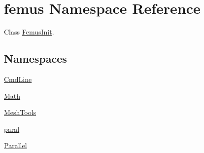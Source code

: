 \hypertarget{namespacefemus}{}\section{femus Namespace Reference}
\label{namespacefemus}


Class \mbox{\hyperlink{classfemus_1_1_femus_init}{Femus\+Init}}.  


\subsection*{Namespaces}
\begin{DoxyCompactItemize}
\item 
 \mbox{\hyperlink{namespacefemus_1_1_cmd_line}{Cmd\+Line}}
\item 
 \mbox{\hyperlink{namespacefemus_1_1_math}{Math}}
\item 
 \mbox{\hyperlink{namespacefemus_1_1_mesh_tools}{Mesh\+Tools}}
\item 
 \mbox{\hyperlink{namespacefemus_1_1paral}{paral}}
\item 
 \mbox{\hyperlink{namespacefemus_1_1_parallel}{Parallel}}
\end{DoxyCompactItemize}
